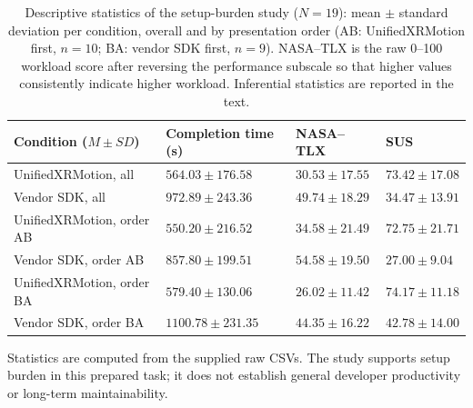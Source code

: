 \documentclass[runningheads]{llncs}
\begin{document}
\begin{table}[t]
	\caption{Descriptive statistics of the setup-burden study ($N=19$): mean $\pm$ standard deviation per condition, overall and by presentation order (AB: UnifiedXRMotion first, $n=10$; BA: vendor SDK first, $n=9$). NASA--TLX is the raw 0--100 workload score after reversing the performance subscale so that higher values consistently indicate higher workload. Inferential statistics are reported in the text.}
	\label{tab:user-results}
	\centering
	\scriptsize
	\setlength{\tabcolsep}{3.5pt}
	\renewcommand{\arraystretch}{1.08}
	\begin{tabularx}{\textwidth}{@{}>{\raggedright\arraybackslash}X
		>{\centering\arraybackslash}p{28mm}
		>{\centering\arraybackslash}p{24mm}
		>{\centering\arraybackslash}p{23mm}@{}}
		\toprule
		Condition ($M\!\pm\!SD$) & Completion time (s)   & NASA--TLX & SUS \\
		\midrule
		UnifiedXRMotion, all
		          & $564.03\!\pm\!176.58$
		          & $30.53\!\pm\!17.55$
		          & $73.42\!\pm\!17.08$                     \\
		Vendor SDK, all
		          & $972.89\!\pm\!243.36$
		          & $49.74\!\pm\!18.29$
		          & $34.47\!\pm\!13.91$                     \\
		\addlinespace[2pt]
		UnifiedXRMotion, order AB
		          & $550.20\!\pm\!216.52$
		          & $34.58\!\pm\!21.49$
		          & $72.75\!\pm\!21.71$                     \\
		Vendor SDK, order AB
		          & $857.80\!\pm\!199.51$
		          & $54.58\!\pm\!19.50$
		          & $27.00\!\pm\!9.04$                      \\
		\addlinespace[2pt]
		UnifiedXRMotion, order BA
		          & $579.40\!\pm\!130.06$
		          & $26.02\!\pm\!11.42$
		          & $74.17\!\pm\!11.18$                     \\
		Vendor SDK, order BA
		          & $1100.78\!\pm\!231.35$
		          & $44.35\!\pm\!16.22$
		          & $42.78\!\pm\!14.00$                     \\
		\bottomrule
	\end{tabularx}

	\vspace{2pt}
	{\footnotesize Statistics are computed from the supplied raw CSVs. The study supports setup burden in this prepared task; it does not establish general developer productivity or long-term maintainability.\par}
\end{table}
\end{document}
